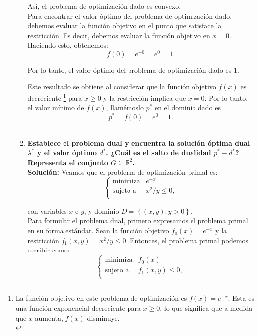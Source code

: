 \begin{enumerate}
\begin{enumerate}[\bfseries (a)]
	    Así, el problema de optimización dado es convexo.\\

	    Para encontrar el valor óptimo del problema de optimización dado, debemos evaluar la función objetivo en el punto que satisface la restricción. Es decir, debemos evaluar la función objetivo en $x = 0$. Haciendo esto, obtenemos:
	    $$f(0) = e^{-0} = e^0 = 1.$$

	    Por lo tanto, el valor óptimo del problema de optimización dado es $1$.

	    Este resultado se obtiene al considerar que la función objetivo $f(x)$ es decreciente
	    \footnote{
		La función objetivo en este problema de optimización es $f(x) = e^{-x}$. Esta es una función exponencial decreciente para $x \geq 0$, lo que significa que a medida que $x$ aumenta, $f(x)$ disminuye.\\
	    }
	    para $x \geq 0$ y la restricción implica que $x = 0$. Por lo tanto, el valor mínimo de $f(x)$, llamémoslo $p^*$ en el dominio dado es 
	    $$p^*=f(0) = e^0 = 1.$$\\


	\item \textbf{\boldmath Establece el problema dual y encuentra la solución óptima dual $\lambda^*$ y el valor óptimo $d^*$. ¿Cuál es el salto de dualidad $p^*-d^*$? Representa el conjunto $G\subseteq \mathbb{R}^2$.}\\

	    \textbf{Solución:} Veamos que el problema de optimización primal es:
	    $$
	    \left\{
		\begin{array}{ll}
			\text{minimiza} & e^{-x}\\
			\text{sujeto a} & x^2/y\leq 0,\\
		\end{array}
	    \right.
	    $$

	    con variables $x$ e $y$, y dominio $D=\left\{(x,y):y>0\right\}$.\\

	    Para formular el problema dual, primero expresamos el problema primal en su forma estándar. Sean la función objetivo $f_0(x) = e^{-x}$ y la restricción $f_1(x,y) = x^2/y \leq 0$. Entonces, el problema primal podemos escribir como:
	    $$
	    \left\{
		\begin{array}{ll}
			\text{minimiza} & f_0(x)\\
			\text{sujeto a} & f_1(x,y) \leq 0,\\
		\end{array}
	    \right.
	    $$


\end{enumerate}
\end{enumerate}
